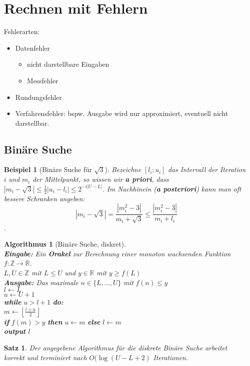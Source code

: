 \documentclass[12pt,a4paper]{article}
\theoremstyle{plain}
\newtheorem{Satz}[Theorem]{Satz}
\newtheorem{Beispiel}[Theorem]{Beispiel}
\newtheorem{Algorithmus}[Theorem]{Algorithmus}
\newcommand{\R}{\mathbb{R}}
\newcommand{\Z}{\mathbb{Z}}
\numberwithin{equation}{section}
\begin{document}
\section{Rechnen mit Fehlern}
Fehlerarten:
\begin{itemize}
\item Datenfehler
\begin{itemize}
\item nicht darstellbare Eingaben
\item Messfehler
\end{itemize}
\item Rundungsfehler
\item \glqq Verfahrensfehler\grqq: bspw. Ausgabe wird nur approximiert, eventuell nicht darstellbar.
\end{itemize}
\subsection{Binäre Suche}
\begin{Beispiel}[Binäre Suche für $\sqrt{3}$]
Bezeichne $\left[l_i;u_i\right]$ das Intervall der Iteration $i$ und $m_i$ der Mittelpunkt, so wissen wir \textbf{a priori}, dass $\left| m_i-\sqrt{3}\right|\leq\frac{1}{2}\left|u_i-l_i\right|\leq 2^{-i|U-L|}$. Im Nachhinein (\textbf{a posteriori}) kann man oft bessere Schranken angeben: \[|m_i-\sqrt{3}|=\frac{|m_i^2-3|}{m_i+\sqrt{3}}\leq \frac{|m_i^2-3|}{m_i+l_i}\].
\end{Beispiel}
\begin{Algorithmus}[Binäre Suche, diskret]\\
\textbf{Eingabe:} Ein \textbf{Orakel} zur Berechnung einer monoton wachsenden Funktion $f:\Z\rightarrow\R$. \\ $L,U \in \Z$ mit $L\leq U$ und $y\in \R$ mit $y\geq f(L)$\\
\textbf{Ausgabe:} Das maximale $n\in\{L,\ldots,U\}$ mit $f(n)\leq y$\\
$l\leftarrow L$\\
$u\leftarrow U+1$\\
\textbf{while} $u>l+1$ \textbf{do:}\\
\text{\qquad}$m\leftarrow\left\lfloor\frac{l+u}{2}\right\rfloor$ \\
\text{\qquad}\textbf{if} $f(m)>y$ \textbf{then} $u\leftarrow m$ \textbf{else} $l\leftarrow m$\\
\textbf{output} $l$
\end{Algorithmus}
\begin{Satz}
Der angegebene Algorithmus für die diskrete Binäre Suche arbeitet korrekt und terminiert nach $O(\log(U-L+2)$ Iterationen.
\end{Satz}
\end{document}
